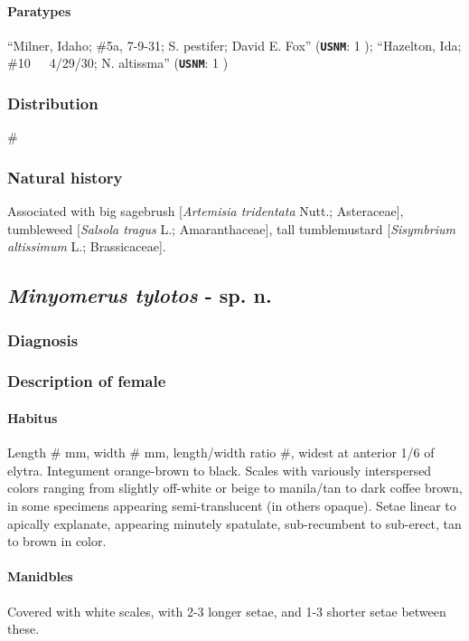 \documentclass[fleqn,10pt,lineno]{wlpeerj} %
\begin{document}
			\paragraph{Paratypes}
				``Milner, Idaho; \#5a, 7-9-31; S. pestifer; David E. Fox'' (\texttt{\textbf{USNM}}: 1 \female);
				``Hazelton, Ida; \#10~~~4/29/30; N. altissma'' (\texttt{\textbf{USNM}}: 1 \male)
		\subsubsection*{Distribution}
			\#
		\subsubsection*{Natural history}
			Associated with big sagebrush [\textit{Artemisia tridentata} Nutt.; Asteraceae], tumbleweed [\textit{Salsola tragus} L.; Amaranthaceae], tall tumblemustard [\textit{Sisymbrium altissimum} L.; Brassicaceae].

	\subsection*{\textit{Minyomerus tylotos} - sp. n.}
		\subsubsection*{Diagnosis}
		\subsubsection*{Description of female}
			\paragraph{Habitus}
				Length \# mm, width \# mm, length/width ratio \#, widest at anterior 1/6 of elytra.
				Integument orange-brown to black. 
				Scales with variously interspersed colors ranging from slightly off-white or beige to manila/tan to dark coffee brown, in some specimens appearing semi-translucent (in others opaque).
				Setae linear to apically explanate, appearing minutely spatulate, sub-recumbent to sub-erect, tan to brown in color.
			\paragraph{Manidbles}
				Covered with white scales, with 2-3 longer setae, and 1-3 shorter setae between these.
\end{document}
